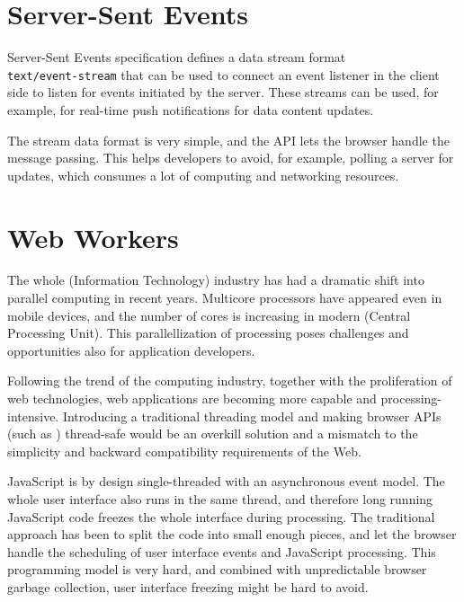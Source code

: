\section{Server-Sent Events}

Server-Sent Events specification \cite{ServerSentEvents} defines a
data stream format\\ \texttt{text/event-stream} that can be used to
connect an event listener in the client side to listen for events
initiated by the server. These streams can be used, for example, for
real-time push notifications for data content updates.

The stream data format is very simple, and the API lets the browser
handle the message passing. This helps developers to avoid, for
example, polling a server for updates, which consumes a lot of
computing and networking resources.

\section{Web Workers}
\label{section:webworkers}

The whole  (Information Technology) industry has had a
dramatic shift into parallel computing in recent years. Multicore
processors have appeared even in mobile devices, and the number of
cores is increasing in modern  (Central Processing
Unit). This parallellization of processing poses challenges and
opportunities also for application developers. \cite{asanovic2009view}

Following the trend of the computing industry, together with the
proliferation of web technologies, web applications are becoming more
capable and processing-intensive. Introducing a traditional threading
model and making browser APIs (such as ) thread-safe would
be an overkill solution and a mismatch to the simplicity and backward
compatibility requirements of the Web.

JavaScript is by design single-threaded with an asynchronous event
model. The whole user interface also runs in the same thread, and
therefore long running JavaScript code freezes the whole interface
during processing. The traditional approach has been to split the code
into small enough pieces, and let the browser handle the scheduling of
user interface events and JavaScript processing. This programming
model is very hard, and combined with unpredictable browser garbage
collection, user interface freezing might be hard to
avoid. \cite{souders2009even}

